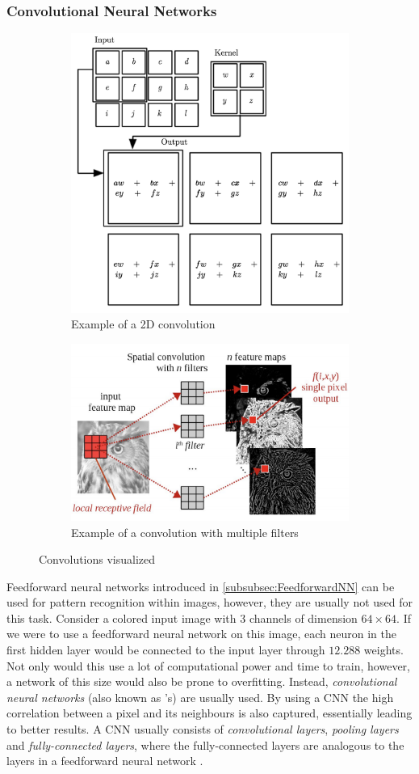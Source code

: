 \documentclass[./main.tex]{subfiles}
\begin{document}
\subsubsection{Convolutional Neural Networks} \label{subsubsec:CNN}
\begin{figure}[htbp]
    \centering
    \begin{subfigure}[t]{0.4\textwidth}
        \centering
        \includegraphics[height = 6 cm]{entities/2d_convolution_example.png}
        \caption{Example of a 2D convolution \cite{DeepLearning}}
    \end{subfigure}
    \begin{subfigure}[t]{0.4\textwidth}
        \centering
        \includegraphics[height = 5 cm]{entities/3d_convolution_example.png}
        \caption{Example of a convolution with multiple filters \cite{Everything}}
    \end{subfigure}
    \caption{Convolutions visualized}
    \label{fig:convolutionexample}
\end{figure}
\noindent Feedforward neural networks introduced in \ref{subsubsec:FeedforwardNN} can be used for pattern recognition within images, however, they are usually not used for this task. Consider a colored input image with $3$ channels of dimension $64 \times 64$. If we were to use a feedforward neural network on this image, each neuron in the first hidden layer would be connected to the input layer through $12.288$ weights. Not only would this use a lot of computational power and time to train, however, a network of this size would also be prone to overfitting. Instead, \textit{convolutional neural networks} (also known as 's) are usually used. By using a CNN the high correlation between a pixel and its neighbours is also captured, essentially leading to better results. A CNN usually consists of \textit{convolutional layers}, \textit{pooling layers} and \textit{fully-connected layers}, where the fully-connected layers are analogous to the layers in a feedforward neural network \cite{CNN}.
\end{document}
